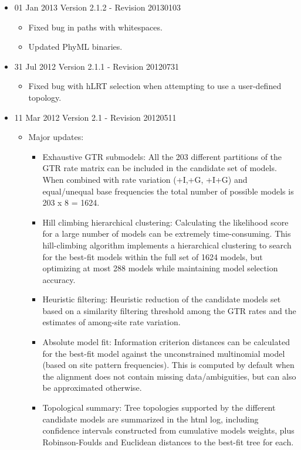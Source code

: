 \begin{itemize}
	\item 01 Jan 2013 Version 2.1.2 - Revision 20130103
	\begin{itemize}
		\item Fixed bug in paths with whitespaces.
		\item Updated PhyML binaries. 
	\end{itemize}

	\item 31 Jul 2012 Version 2.1.1 - Revision 20120731
	\begin{itemize}
		\item Fixed bug with hLRT selection when attempting to use a user-defined topology. 
	\end{itemize}

	\item 11 Mar 2012 Version 2.1 - Revision 20120511
	\begin{itemize}
		\item Major updates:
		\begin{itemize}
			\item Exhaustive GTR submodels: All the 203 different partitions of the GTR rate matrix can be included in the candidate set of models. When combined with rate variation (+I,+G, +I+G) and equal/unequal base frequencies the total number of possible models is 203 x 8 = 1624. 
			\item Hill climbing hierarchical clustering: Calculating the likelihood score for a large number of models can be extremely time-consuming. This hill-climbing algorithm implements a hierarchical clustering to search for the best-fit models within the full set of 1624 models, but optimizing at most 288 models while maintaining model selection accuracy. 
			\item Heuristic filtering: Heuristic reduction of the candidate models set based on a similarity filtering threshold among the GTR rates and the estimates of among-site rate variation. 
			\item Absolute model fit: Information criterion distances can be calculated for the best-fit model against the unconstrained multinomial model (based on site pattern frequencies). This is computed by default when the alignment does not contain missing data/ambiguities, but can also be approximated otherwise. 
			\item Topological summary: Tree topologies supported by the different candidate models are summarized in the html log, including confidence intervals constructed from cumulative models weights, plus Robinson-Foulds and Euclidean distances to the best-fit tree for each. 

\end{itemize}
\end{itemize}
\end{itemize}
